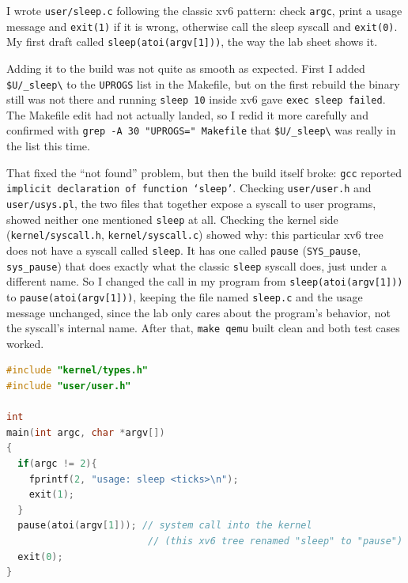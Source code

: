 \documentclass[12pt,a4paper]{article}
\begin{document}
\hspace{0.8cm} I wrote \texttt{user/sleep.c} following the classic xv6 pattern:
check \texttt{argc}, print a usage message and \texttt{exit(1)} if it is wrong,
otherwise call the sleep syscall and \texttt{exit(0)}. My first draft called
\texttt{sleep(atoi(argv[1]))}, the way the lab sheet shows it.

\hspace{0.8cm} Adding it to the build was not quite as smooth as expected.
First I added \texttt{\$U/\_sleep\textbackslash} to the \texttt{UPROGS} list in
the Makefile, but on the first rebuild the binary still was not there and
running \texttt{sleep 10} inside xv6 gave \texttt{exec sleep failed}. The
Makefile edit had not actually landed, so I redid it more carefully and
confirmed with \texttt{grep -A 30 "UPROGS=" Makefile} that
\texttt{\$U/\_sleep\textbackslash} was really in the list this time.

\hspace{0.8cm} That fixed the ``not found'' problem, but then the build itself
broke: \texttt{gcc} reported \texttt{implicit declaration of function
`sleep'}. Checking \texttt{user/user.h} and \texttt{user/usys.pl}, the two
files that together expose a syscall to user programs, showed neither one
mentioned \texttt{sleep} at all. Checking the kernel side
(\texttt{kernel/syscall.h}, \texttt{kernel/syscall.c}) showed why: this
particular xv6 tree does not have a syscall called \texttt{sleep}. It has one
called \texttt{pause} (\texttt{SYS\_pause}, \texttt{sys\_pause}) that does
exactly what the classic \texttt{sleep} syscall does, just under a different
name. So I changed the call in my program from \texttt{sleep(atoi(argv[1]))}
to \texttt{pause(atoi(argv[1]))}, keeping the file named \texttt{sleep.c} and
the usage message unchanged, since the lab only cares about the program's
behavior, not the syscall's internal name. After that, \texttt{make qemu}
built clean and both test cases worked.

\par\noindent\begin{minipage}{\linewidth}
\begin{lstlisting}[language=C, caption={Final version of \texttt{user/sleep.c}}, label={lst:sleepc}]
#include "kernel/types.h"
#include "user/user.h"

int
main(int argc, char *argv[])
{
  if(argc != 2){
    fprintf(2, "usage: sleep <ticks>\n");
    exit(1);
  }
  pause(atoi(argv[1])); // system call into the kernel
                         // (this xv6 tree renamed "sleep" to "pause")
  exit(0);
}
\end{lstlisting}
\end{minipage}\par
\end{document}
